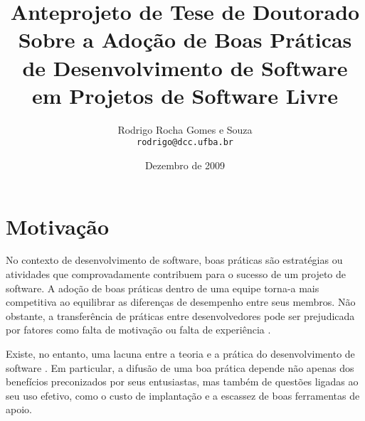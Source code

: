 \documentclass{article}
\title{
{\small Anteprojeto de Tese de Doutorado} \\
Sobre a Adoção de Boas Práticas 
de Desenvolvimento de Software 
em Projetos de Software Livre}
\author{Rodrigo Rocha Gomes e Souza\\
\texttt{rodrigo@dcc.ufba.br}}
\date{Dezembro de 2009}
\begin{document}
\sloppy
\maketitle







\section{Motivação} %

No contexto de desenvolvimento de software, boas práticas são estratégias ou
atividades que comprovadamente contribuem para o sucesso de um projeto de
software. A adoção de boas práticas dentro de uma equipe torna-a mais
competitiva ao equilibrar as diferenças de desempenho entre seus membros. Não
obstante, a transferência de práticas entre desenvolvedores pode ser
prejudicada por fatores como falta de motivação ou falta de experiência
\cite{szulanski1996}.


Existe, no entanto, uma lacuna entre a teoria e a prática do desenvolvimento de
software \cite{glass1996}. Em particular, a difusão de uma boa prática depende
não apenas dos benefícios preconizados por seus entusiastas, mas também de
questões ligadas ao seu uso efetivo, como o custo de implantação e a escassez de
boas ferramentas de apoio. 
\end{document}
